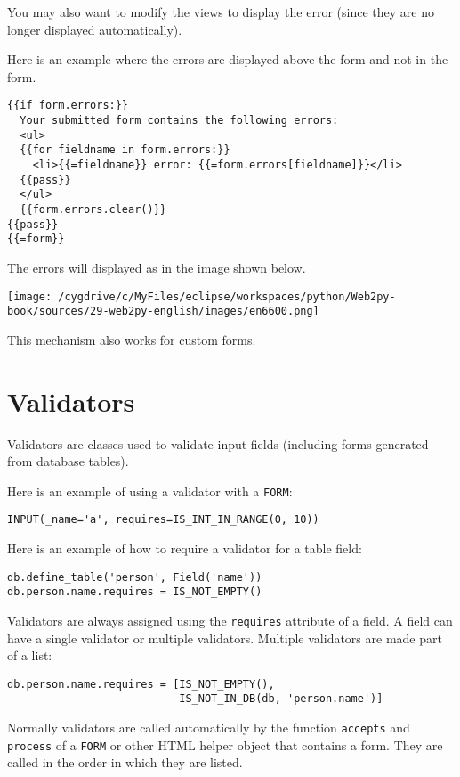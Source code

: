\documentclass[justified,sixbynine,notoc]{tufte-book}
\def\ft{\small\tt}
\def\inxx#1{\index{#1}}
\begin{document}
\begin{fullwidth}
You may also want to modify the views to display the error (since they are no longer displayed automatically).

Here is an example where the errors are displayed above the form and not in the form.
\begin{lstlisting}[keywords={}]
{{if form.errors:}}
  Your submitted form contains the following errors:
  <ul>
  {{for fieldname in form.errors:}}
    <li>{{=fieldname}} error: {{=form.errors[fieldname]}}</li>
  {{pass}}
  </ul>
  {{form.errors.clear()}}
{{pass}}
{{=form}}
\end{lstlisting}

The errors will displayed as in the image shown below.


\goodbreak\begin{center}\texttt{[image: /cygdrive/c/MyFiles/eclipse/workspaces/python/Web2py-book/sources/29-web2py-english/images/en6600.png]}\end{center}


This mechanism also works for custom forms.

\goodbreak\section{Validators}

\inxx{validators}

Validators are classes used to validate input fields (including forms generated from database tables).

Here is an example of using a validator with a {\ft FORM}:
\begin{lstlisting}
INPUT(_name='a', requires=IS_INT_IN_RANGE(0, 10))
\end{lstlisting}

Here is an example of how to require a validator for a table field:
\begin{lstlisting}
db.define_table('person', Field('name'))
db.person.name.requires = IS_NOT_EMPTY()
\end{lstlisting}

Validators are always assigned using the {\ft requires} attribute of a field. A field can have a single validator or multiple validators. Multiple validators are made part of a list:
\begin{lstlisting}
db.person.name.requires = [IS_NOT_EMPTY(),
                           IS_NOT_IN_DB(db, 'person.name')]
\end{lstlisting}

Normally validators are called automatically by the function {\ft accepts} and {\ft process} of a {\ft FORM} or other HTML helper object that contains a form. They are called in the order in which they are listed.


\end{fullwidth}
\end{document}
